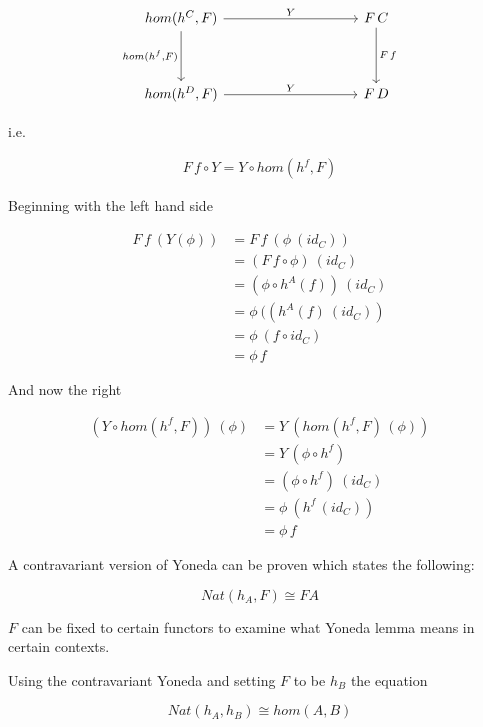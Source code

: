 \documentclass[a4paper,12pt]{article}
\begin{document}
\[\begin{tikzcd}[sep=huge]
    {hom(h^C, F)} \arrow[d, "{hom(h^f, F)}"'] \arrow[rr, "Y"] &  & {F \,C}
    \arrow[d, "{F \, f}"] \\
    {hom(h^D, F)} \arrow[rr, "Y"] &  & {F \, D}
\end{tikzcd}\]

i.e.

\begin{align*}
    F \, f \circ Y = Y \circ hom(h^{f}, F)
\end{align*}

Beginning with the left hand side

\begin{align*}
    F \, f \ ( Y(\phi)) &= F \, f \ (\phi \ (id_{C})) \\
    &= (F \, f \circ \phi) \ (id_{C}) \\
    &= (\phi \circ h^{A}(f)) \ (id_{C}) \\
    &= \phi \ ((h^{A}(f) \ (id_{C})) \\
    &= \phi \ (f \circ id_{C}) \\
    &= \phi \, f
\end{align*}

And now the right

\begin{align*}
    (Y \circ hom(h^{f}, F)) \ (\phi) &= Y \ (hom(h^{f}, F) \, (\phi)) \\
    &= Y \, (\phi \circ h^{f}) \\
    &= (\phi \circ h^{f}) \ (id_{C}) \\
    &= \phi \ (h^{f} \, (id_{C})) \\ 
    &=  \phi \, f
\end{align*}

A contravariant version of Yoneda can be proven which states the following:

\begin{equation}
    Nat(h_{A}, F) \cong FA
    \label{coyoneda}
\end{equation}

$F$ can be fixed to certain functors to examine what Yoneda lemma means in
certain contexts.

Using the contravariant Yoneda and setting $F$ to be $h_{B}$ the equation

\begin{equation}
    Nat(h_{A}, h_{B}) \cong hom(A,B)
    \label{yonembedding}
\end{equation}
\end{document}
